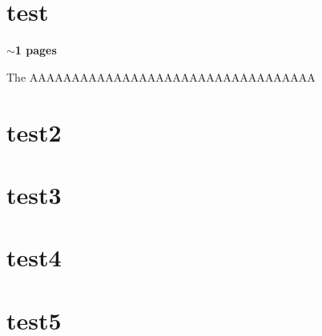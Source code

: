 \section{test}
\textbf{$\sim$1 pages}

The AAAAAAAAAAAAAAAAAAAAAAAAAAAAAAAAAA

\section{test2}
\section{test3}
\section*{test4}
\section*{test5}



\pagebreak
